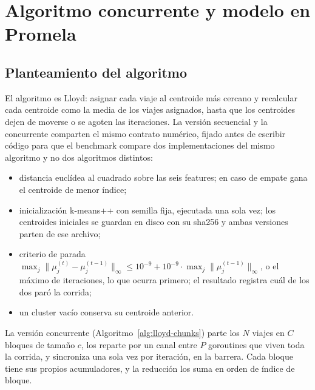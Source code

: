 \section{Algoritmo concurrente y modelo en Promela}\label{sec:promela}

\subsection{Planteamiento del algoritmo}

El algoritmo es Lloyd: asignar cada viaje al centroide más cercano y recalcular cada centroide como
la media de los viajes asignados, hasta que los centroides dejen de moverse o se agoten las
iteraciones. La versión secuencial y la concurrente comparten el mismo contrato numérico, fijado
antes de escribir código para que el benchmark compare dos implementaciones del mismo algoritmo y
no dos algoritmos distintos:

\begin{itemize}
  \item distancia euclídea al cuadrado sobre las seis features; en caso de empate gana el centroide
        de menor índice;
  \item inicialización k-means++ con semilla fija, ejecutada una sola vez; los centroides iniciales se
        guardan en disco con su sha256 y ambas versiones parten de ese archivo;
  \item criterio de parada $\max_j \lVert \mu_j^{(t)} - \mu_j^{(t-1)} \rVert_\infty \le
        10^{-9} + 10^{-9} \cdot \max_j \lVert \mu_j^{(t-1)} \rVert_\infty$, o el máximo de
        iteraciones, lo que ocurra primero; el resultado registra cuál de los dos paró la corrida;
  \item un cluster vacío conserva su centroide anterior.
\end{itemize}

La versión concurrente (Algoritmo~\ref{alg:lloyd-chunks}) parte los $N$ viajes en $C$ bloques de
tamaño $c$, los reparte por un canal entre $P$ goroutines que viven toda la corrida, y sincroniza una
sola vez por iteración, en la barrera. Cada bloque tiene sus propios acumuladores, y la reducción los
suma en orden de índice de bloque.

